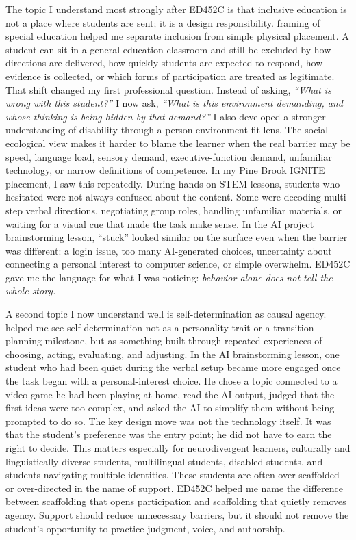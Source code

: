 \documentclass[11pt]{article}
\begin{document}
The topic I understand most strongly after ED452C is that inclusive education is not a place where students are sent; it is a design responsibility. \citet{wehmeyer2021inclusive} framing of special education helped me separate inclusion from simple physical placement. A student can sit in a general education classroom and still be excluded by how directions are delivered, how quickly students are expected to respond, how evidence is collected, or which forms of participation are treated as legitimate. That shift changed my first professional question. Instead of asking, \textit{``What is wrong with this student?''} I now ask, \textit{``What is this environment demanding, and whose thinking is being hidden by that demand?''} I also developed a stronger understanding of disability through a person-environment fit lens. The social-ecological view makes it harder to blame the learner when the real barrier may be speed, language load, sensory demand, executive-function demand, unfamiliar technology, or narrow definitions of competence. In my Pine Brook IGNITE placement, I saw this repeatedly. During hands-on STEM lessons, students who hesitated were not always confused about the content. Some were decoding multi-step verbal directions, negotiating group roles, handling unfamiliar materials, or waiting for a visual cue that made the task make sense. In the AI project brainstorming lesson, ``stuck'' looked similar on the surface even when the barrier was different: a login issue, too many AI-generated choices, uncertainty about connecting a personal interest to computer science, or simple overwhelm. ED452C gave me the language for what I was noticing: \textit{behavior alone does not tell the whole story.}

A second topic I now understand well is self-determination as causal agency. \citet{wehmeyer2013selfdetermination} helped me see self-determination not as a personality trait or a transition-planning milestone, but as something built through repeated experiences of choosing, acting, evaluating, and adjusting. In the AI brainstorming lesson, one student who had been quiet during the verbal setup became more engaged once the task began with a personal-interest choice. He chose a topic connected to a video game he had been playing at home, read the AI output, judged that the first ideas were too complex, and asked the AI to simplify them without being prompted to do so. The key design move was not the technology itself. It was that the student's preference was the entry point; he did not have to earn the right to decide. This matters especially for neurodivergent learners, culturally and linguistically diverse students, multilingual students, disabled students, and students navigating multiple identities. These students are often over-scaffolded or over-directed in the name of support. ED452C helped me name the difference between scaffolding that opens participation and scaffolding that quietly removes agency. Support should reduce unnecessary barriers, but it should not remove the student's opportunity to practice judgment, voice, and authorship.
\end{document}
